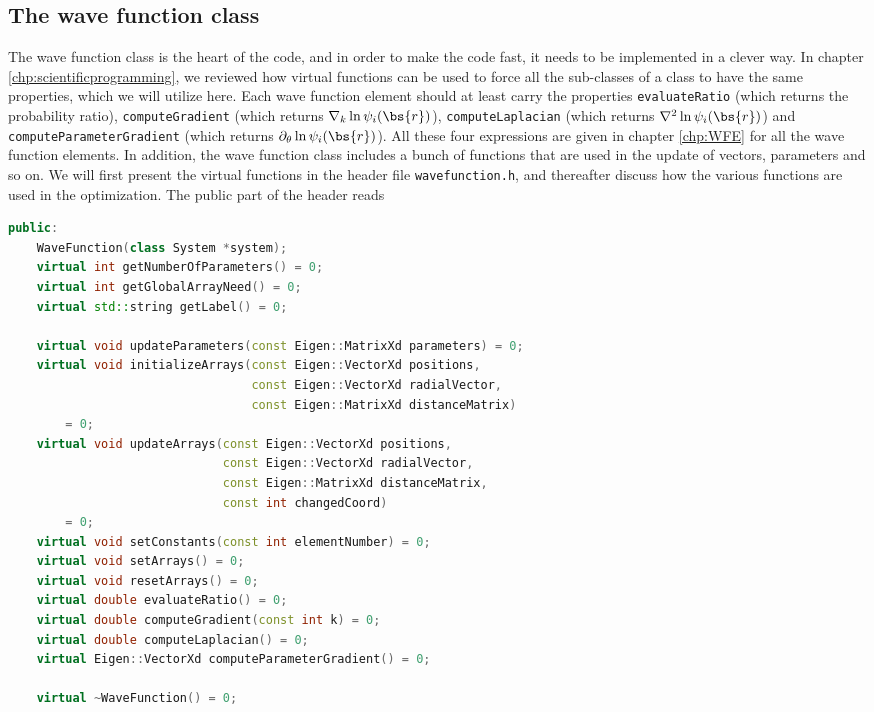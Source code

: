 \subsection{The wave function class} \label{sec:thewavefunctionclass}
The wave function class is the heart of the code, and in order to make the code fast, it needs to be implemented in a clever way. In chapter \ref{chp:scientificprogramming}, we reviewed how virtual functions can be used to force all the sub-classes of a class to have the same properties, which we will utilize here. Each wave function element should at least carry the properties \lstinline{evaluateRatio} (which returns the probability ratio), \lstinline{computeGradient} (which returns $\nabla_k\ln\psi_i(\bs{r})$), \lstinline{computeLaplacian} (which returns $\nabla^2\ln\psi_i(\bs{r})$) and \lstinline{computeParameterGradient} (which returns $\partial_{\theta}\ln\psi_i(\bs{r})$). All these four expressions are given in chapter \ref{chp:WFE} for all the wave function elements. In addition, the wave function class includes a bunch of functions that are used in the update of vectors, parameters and so on. We will first present the virtual functions in the header file \lstinline{wavefunction.h}, and thereafter discuss how the various functions are used in the optimization. The public part of the header reads
\lstset{basicstyle=\scriptsize}
\begin{lstlisting}[language=c++,caption={The code is taken from \lstinline{wavefunction.h}, presenting all the virtual functions that are used in the wave function class. Clang formating is used.}]
public:
	WaveFunction(class System *system);
	virtual int getNumberOfParameters() = 0;
	virtual int getGlobalArrayNeed() = 0;
	virtual std::string getLabel() = 0;

	virtual void updateParameters(const Eigen::MatrixXd parameters) = 0;
	virtual void initializeArrays(const Eigen::VectorXd positions,
								  const Eigen::VectorXd radialVector,
								  const Eigen::MatrixXd distanceMatrix)
		= 0;
	virtual void updateArrays(const Eigen::VectorXd positions,
							  const Eigen::VectorXd radialVector,
							  const Eigen::MatrixXd distanceMatrix,
							  const int changedCoord)
		= 0;
	virtual void setConstants(const int elementNumber) = 0;
	virtual void setArrays() = 0;
	virtual void resetArrays() = 0;
	virtual double evaluateRatio() = 0;
	virtual double computeGradient(const int k) = 0;
	virtual double computeLaplacian() = 0;
	virtual Eigen::VectorXd computeParameterGradient() = 0;

	virtual ~WaveFunction() = 0;

\end{lstlisting}

